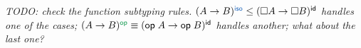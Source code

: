 \documentclass[b5,wide,libertine,ribbons]{rntz}
\newcommand{\todo}[1]{{\itshape\color{blue}#1}}
\newcommand{\ms}[1]{\ensuremath{\mathsf{#1}}}
\newcommand{\id}{\ms{id}}
\newcommand{\op}{\ms{op}}
\newcommand{\iso}{\ms{iso}}     %
\newcommand{\tm}{\id}                   %
\newcommand{\ta}{{\color{ACMGreen}\op}} %
\newcommand{\ti}{{\color{ACMBlue}\iso}} %
\renewcommand{\ta}{{\color{ForestGreen}\op}}   %
\renewcommand{\ti}{{\color{NavyBlue}\iso}}     %
\begin{document}
\todo{TODO: check the function subtyping rules. $(A \to B)^\ti \le (\Box A \to
  \Box B)^\tm$ handles one of the cases; $(A \to B)^\ta \equiv (\op\;A \to
  \op\;B)^\tm$ handles another; what about the last one?}






\end{document}

